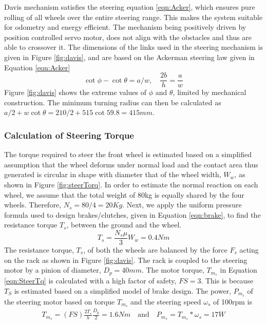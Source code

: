 Davis mechanism satisfies the steering equation \ref{eqn:Acker}, which ensures pure rolling of all  wheels over the entire steering range. This makes the system suitable for odometry and energy efficient.  The mechanism being positively driven by position controlled servo motor, does not align with the obstacles and thus are able to crossover it. The dimensions of the links used in the steering mechanism is given in Figure \ref{fig:davis}, and are based on the Ackerman steering law given in Equation \ref{eqn:Acker}
\begin{equation}
\label{eqn:Acker}
\cot\phi-\cot\theta=a/w, \quad  \frac{2b}{h}=\frac{a}{w}
\end{equation}
Figure \ref{fig:davis} shows the extreme values of $\phi$ and $ \theta$, limited by mechanical construction. The minimum turning radius can then be calculated as  $a/2+w\cot\theta=210/2+515\cot59.8=415mm$. 


\subsubsection{Calculation of Steering Torque}
The torque required to steer the front wheel is estimated based on a simplified assumption that the wheel deforms under normal load and the contact area thus generated is  circular in shape with diameter that of the wheel width, $W_w$, as shown in Figure \ref{fig:steerTorq}. In order to estimate the normal reaction on each wheel, we assume that the total weight of 80kg is equally shared by the four wheels. Therefore, $N_s=80/4=20Kg$. Next, we apply the uniform pressure formula used to design brakes/clutches, given in Equation \ref{eqn:brake}, to find the resistance  torque $T_s$, between the ground and the wheel. 
\begin{equation}
\label{eqn:brake}
T_s=\frac{N_s\mu}{3}W_w= 0.4Nm
\end{equation}  
The resistance torque, $T_s$, of  both the wheels  are balanced by the force $F_s$ acting on the rack as shown in Figure \ref{fig:davis}. The rack is coupled to the steering motor by a pinion of diameter, $D_p=40mm$. The motor  torque, $T_{m_s}$  in Equation  \ref{eqn:SteerTq} is calculated with a  high factor of safety, $FS=3$. This is because $T_S$ is estimated  based on a simplified model of brake design. The power, $P_{m_s}$ of the steering motor based on  torque $T_{m_s}$ and the steering speed $\omega_s$ of 100rpm is 
\begin{equation}
\begin{aligned}
\label{eqn:SteerTq}
T_{m_s}=(FS)\frac{2T_s}{h}\frac{D_p}{2}=1.6Nm \quad \text{and}\quad P_{m_s}=T_{m_s}*\omega_s=17W
\end{aligned}
\end{equation} 

